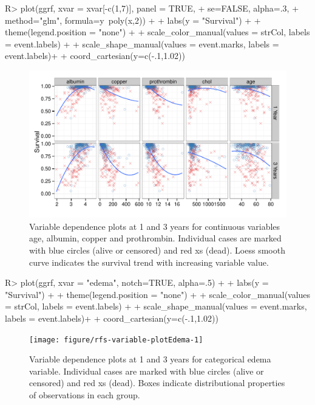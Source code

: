 \documentclass[nojss]{jss}
\begin{document}
\begin{Schunk}
\begin{Sinput}
R> plot(ggrf, xvar = xvar[-c(1,7)], panel = TRUE, 
+      se=FALSE, alpha=.3, 
+      method="glm", formula=y~poly(x,2)) + 
+   labs(y = "Survival") + 
+   theme(legend.position = "none") + 
+   scale_color_manual(values = strCol, labels = event.labels) + 
+   scale_shape_manual(values = event.marks, labels = event.labels)+
+   coord_cartesian(y=c(-.1,1.02))
\end{Sinput}
\begin{figure}[!htpb]

{\centering \includegraphics[width=\maxwidth]{figure/rfs-variable-plotCombines-1} 

}

\caption[Variable dependence plots at 1 and 3 years for continuous variables age, albumin, copper and prothrombin]{Variable dependence plots at 1 and 3 years for continuous variables age, albumin, copper and prothrombin. Individual cases are marked with blue circles (alive or censored) and red xs (dead). Loess smooth curve indicates the survival trend with increasing variable value.\label{fig:variable-plotCombines}}
\end{figure}
\end{Schunk}

\begin{Schunk}
\begin{Sinput}
R> plot(ggrf, xvar = "edema", notch=TRUE, alpha=.5) + 
+   labs(y = "Survival") + 
+   theme(legend.position = "none") + 
+   scale_color_manual(values = strCol, labels = event.labels) + 
+   scale_shape_manual(values = event.marks, labels = event.labels)+
+   coord_cartesian(y=c(-.1,1.02))
\end{Sinput}
\begin{figure}[!htpb]

{\centering \texttt{[image: figure/rfs-variable-plotEdema-1]} 

}

\caption[Variable dependence plots at 1 and 3 years for categorical edema variable]{Variable dependence plots at 1 and 3 years for categorical edema variable. Individual cases are marked with blue circles (alive or censored) and red xs (dead). Boxes indicate distributional properties of observations in each group.\label{fig:variable-plotEdema}}
\end{figure}
\end{Schunk}
\end{document}
